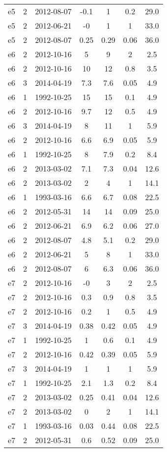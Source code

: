 \begin{table*}[htp]
\begin{tabular}{ccccccc}
e5 & 2 & 2012-08-07 & -0.1 & 1 & 0.2 & 29.0 \\
e5 & 2 & 2012-06-21 & -0 & 1 & 1 & 33.0 \\
e5 & 2 & 2012-08-07 & 0.25 & 0.29 & 0.06 & 36.0 \\
e6 & 2 & 2012-10-16 & 5 & 9 & 2 & 2.5 \\
e6 & 2 & 2012-10-16 & 10 & 12 & 0.8 & 3.5 \\
e6 & 3 & 2014-04-19 & 7.3 & 7.6 & 0.05 & 4.9 \\
e6 & 1 & 1992-10-25 & 15 & 15 & 0.1 & 4.9 \\
e6 & 2 & 2012-10-16 & 9.7 & 12 & 0.5 & 4.9 \\
e6 & 3 & 2014-04-19 & 8 & 11 & 1 & 5.9 \\
e6 & 2 & 2012-10-16 & 6.6 & 6.9 & 0.05 & 5.9 \\
e6 & 1 & 1992-10-25 & 8 & 7.9 & 0.2 & 8.4 \\
e6 & 2 & 2013-03-02 & 7.1 & 7.3 & 0.04 & 12.6 \\
e6 & 2 & 2013-03-02 & 2 & 4 & 1 & 14.1 \\
e6 & 1 & 1993-03-16 & 6.6 & 6.7 & 0.08 & 22.5 \\
e6 & 2 & 2012-05-31 & 14 & 14 & 0.09 & 25.0 \\
e6 & 2 & 2012-06-21 & 6.9 & 6.2 & 0.06 & 27.0 \\
e6 & 2 & 2012-08-07 & 4.8 & 5.1 & 0.2 & 29.0 \\
e6 & 2 & 2012-06-21 & 5 & 8 & 1 & 33.0 \\
e6 & 2 & 2012-08-07 & 6 & 6.3 & 0.06 & 36.0 \\
e7 & 2 & 2012-10-16 & -0 & 3 & 2 & 2.5 \\
e7 & 2 & 2012-10-16 & 0.3 & 0.9 & 0.8 & 3.5 \\
e7 & 2 & 2012-10-16 & 0.2 & 1 & 0.5 & 4.9 \\
e7 & 3 & 2014-04-19 & 0.38 & 0.42 & 0.05 & 4.9 \\
e7 & 1 & 1992-10-25 & 1 & 0.6 & 0.1 & 4.9 \\
e7 & 2 & 2012-10-16 & 0.42 & 0.39 & 0.05 & 5.9 \\
e7 & 3 & 2014-04-19 & 1 & 1 & 1 & 5.9 \\
e7 & 1 & 1992-10-25 & 2.1 & 1.3 & 0.2 & 8.4 \\
e7 & 2 & 2013-03-02 & 0.25 & 0.41 & 0.04 & 12.6 \\
e7 & 2 & 2013-03-02 & 0 & 2 & 1 & 14.1 \\
e7 & 1 & 1993-03-16 & 0.03 & 0.44 & 0.08 & 22.5 \\
e7 & 2 & 2012-05-31 & 0.6 & 0.52 & 0.09 & 25.0 \\

\end{tabular}
\end{table*}
